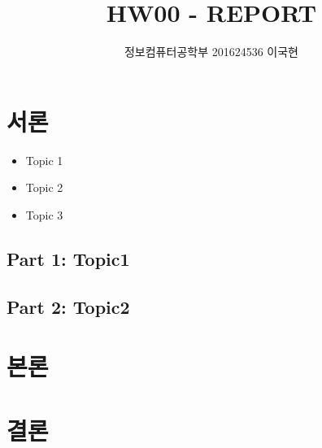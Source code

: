 \documentclass[]{report}
\title{HW00 - REPORT}
\author{정보컴퓨터공학부 201624536 이국현}
\begin{document}
\maketitle


\chapter{서론}
\begin{itemize}
	\item Topic 1
	\item Topic 2
	\item Topic 3
\end{itemize}

\section{Part 1: Topic1}
\section*{Part 2: Topic2}

\chapter{본론}


\chapter{결론}
\end{document}
